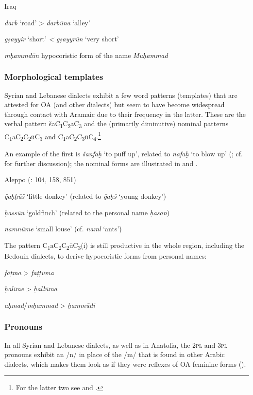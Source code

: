 \documentclass[output=paper]{langsci/langscibook}
\begin{document}
\ea\label{una}
Iraq \citep[72]{Masliyah1997}

\textit{darb} ‘road’ > \textit{darbūna} ‘alley’

\textit{gṣayyir} ‘short’ \textit{<} \textit{gṣayyrūn} ‘very short’

\textit{mḥammdūn} hypocoristic form of the name \textit{Muḥammad}
\z

\subsubsection{Morphological templates}
Syrian and Lebanese dialects exhibit a few word patterns (templates) that are attested for OA (and other dialects) but seem to have become widespread through contact with Aramaic due to their frequency in the latter. These are the verbal pattern šaC\textsubscript{1}C\textsubscript{2}aC\textsubscript{3} and the (primarily diminutive) nominal patterns C\textsubscript{1}aC\textsubscript{2}C\textsubscript{2}ūC\textsubscript{3} and C\textsubscript{1}aC\textsubscript{2}C\textsubscript{3}ūC\textsubscript{4}.\footnote{For the latter two see \citet{Corriente1969} and \citet{Procházka2004}.}\textsubscript{} 

An example of the first is \textit{šanfaḫ} ‘to puff up’, related to \textit{nafaḫ} ‘to blow up’ (\citealt[83]{Féghali1918}; cf. \citealt[201]{Lentin2018} for further discussion); the nominal forms are illustrated in  and .

\ea\label{donkey}
Aleppo (\citealt{Barthélemy1935}: 104, 158, 851) 

\textit{ǧaḥḥūš} ‘little donkey’ (related to \textit{ǧaḥš} `young donkey')

\textit{ḥassūn} ‘goldfinch’ (related to the personal name \textit{ḥasan})

\textit{namnūme} ‘small louse’ (cf. \textit{naml} `ants')
\z

The pattern C\textsubscript{1}aC\textsubscript{2}C\textsubscript{2}ūC\textsubscript{3}(i)\textsubscript{} is still productive in the whole region, including the Bedouin dialects, to derive hypocoristic forms from personal names:

\ea\label{fatima}
\textit{fāṭma} > \textit{faṭṭūma}

\textit{ḥalīme} > \textit{ḥallūma}

\textit{aḥmad}/\textit{mḥammad} > \textit{ḥammūdi} 
\z

\subsubsection{Pronouns}
In all Syrian and Lebanese dialects, as well as in Anatolia, the \textsc{2pl} and \textsc{3pl} pronouns exhibit an /n/ in place of the /m/ that is found in other Arabic dialects, which makes them look as if they were reflexes of OA feminine forms (). 
\end{document}
